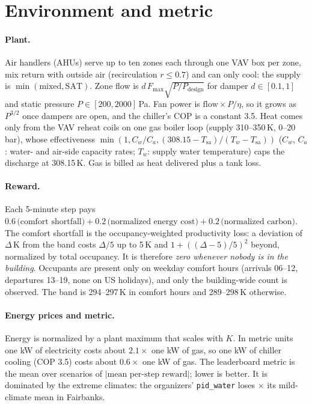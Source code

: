 \section{Environment and metric}
\label{sec:env}

\paragraph{Plant.} Air handlers (AHUs) serve up to ten zones each through one VAV box per zone, mix return with outside air (recirculation $r\le 0.7$) and can only cool: the supply is $\min(\text{mixed}, \text{SAT})$. Zone flow is $d\,F_{\max}\sqrt{P/P_{\text{design}}}$ for damper $d\in[0.1,1]$ and static pressure $P\in[200,2000]$\,Pa. Fan power is $\text{flow}\times P/\eta$, so it grows as $P^{3/2}$ once dampers are open, and the chiller's COP is a constant 3.5. Heat comes only from the VAV reheat coils on one gas boiler loop (supply 310--350\,K, 0--20\,bar), whose effectiveness $\min(1, C_w/C_a, (308.15-T_{\text{sa}})/(T_w - T_{\text{sa}}))$ ($C_w$, $C_a$: water- and air-side capacity rates; $T_w$: supply water temperature) caps the discharge at 308.15\,K. Gas is billed as heat delivered plus a tank loss.

\paragraph{Reward.} Each 5-minute step pays $0.6\,\text{(comfort shortfall)} + 0.2\,\text{(normalized energy cost)} + 0.2\,\text{(normalized carbon)}$. The comfort shortfall is the occupancy-weighted productivity loss: a deviation of $\Delta$\,K from the band costs $\Delta/5$ up to 5\,K and $1+((\Delta-5)/5)^2$ beyond, normalized by total occupancy. It is therefore \emph{zero whenever nobody is in the building}. Occupants are present only on weekday comfort hours (arrivals 06--12, departures 13--19, none on US holidays), and only the building-wide count is observed. The band is 294--297\,K in comfort hours and 289--298\,K otherwise.

\paragraph{Energy prices and metric.} Energy is normalized by a plant maximum that scales with $K$. In metric units one kW of electricity costs about $2.1\times$ one kW of gas, so one kW of chiller cooling (COP 3.5) costs about $0.6\times$ one kW of gas. The leaderboard metric is the mean over scenarios of $|\text{mean per-step reward}|$; lower is better. It is dominated by the extreme climates: the organizers' \texttt{pid\_water} loses \ExtremeRatioFairbanks$\times$ its mild-climate mean in Fairbanks.

